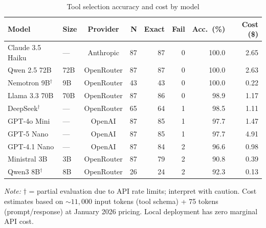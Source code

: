 \begin{table}[htbp]
\centering
\begin{threeparttable}
\small
\caption{Tool selection accuracy and cost by model}
\label{tab:model-summary}
\begin{tabular}{llcrrrrr}
  \toprule
Model & Size & Provider & N & Exact & Fail & Acc.\ (\%) & Cost (\$) \\
  \midrule
Claude 3.5 Haiku & --- & Anthropic & 87 & 87 & 0 & 100.0 & 2.65 \\
Qwen 2.5 72B & 72B & OpenRouter & 87 & 87 & 0 & 100.0 & 2.63 \\
Nemotron 9B$^\dagger$ & 9B & OpenRouter & 43 & 43 & 0 & 100.0 & 0.22 \\
Llama 3.3 70B & 70B & OpenRouter & 87 & 86 & 0 & 98.9 & 1.17 \\
DeepSeek$^\dagger$ & --- & OpenRouter & 65 & 64 & 1 & 98.5 & 1.11 \\
GPT-4o Mini & --- & OpenAI & 87 & 85 & 1 & 97.7 & 1.47 \\
GPT-5 Nano & --- & OpenAI & 87 & 85 & 1 & 97.7 & 4.91 \\
GPT-4.1 Nano & --- & OpenAI & 87 & 84 & 2 & 96.6 & 0.98 \\
Ministral 3B & 3B & OpenRouter & 87 & 79 & 2 & 90.8 & 0.39 \\
Qwen3 8B$^\dagger$ & 8B & OpenRouter & 26 & 24 & 2 & 92.3 & 0.13 \\
  \bottomrule
\end{tabular}
\begin{tablenotes}[flushleft]
\item \emph{Note:} $\dagger$ = partial evaluation due to API rate limits;
interpret with caution. Cost estimates based on ${\sim}11{,}000$ input
tokens (tool schema) + 75 tokens (prompt/response) at January 2026
pricing. Local deployment has zero marginal API cost.
\end{tablenotes}
\end{threeparttable}
\end{table}
